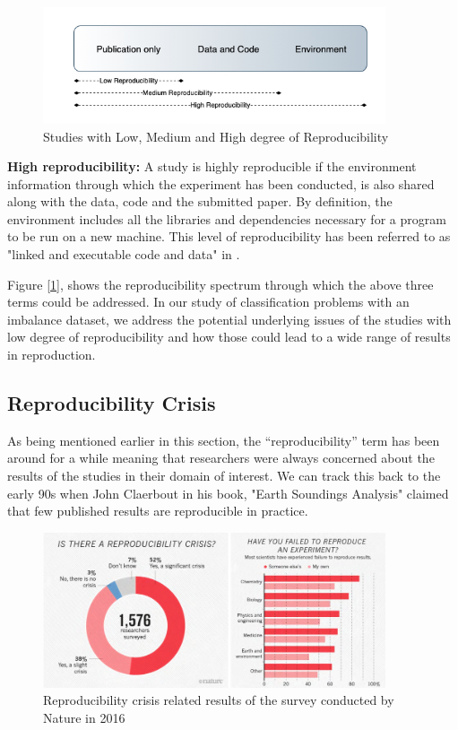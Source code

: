 \begin{figure}[ht]
    \centering
    \includegraphics[width=0.90\textwidth]{figures/02HighLowReproducibility.jpg}
    \caption{Studies with Low, Medium and High degree of Reproducibility}
    \label{fig:LowHighReproducibility}
\end{figure}

\textbf{High reproducibility:} A study is highly reproducible if the environment information through which the experiment 
has been conducted, is also shared along with the data, code and the submitted paper. By definition, the environment 
includes all the libraries and dependencies necessary for a program to be run on a new machine. This level of reproducibility 
has been referred to as "linked and executable code and data" in \cite{peng_reproducible_2011}.

Figure [\ref{fig:LowHighReproducibility}], shows the reproducibility spectrum through which the above three terms 
could be addressed. In our study of classification problems with an imbalance dataset, we address the potential 
underlying issues of the studies with low degree of reproducibility and how those could lead to a wide range of 
results in reproduction.

\subsection{Reproducibility Crisis}
As being mentioned earlier in this section, the “reproducibility” term has been around for a while meaning that 
researchers were always concerned about the results of the studies in their domain of interest. We can track this 
back to the early 90s when John Claerbout in his book, "Earth Soundings Analysis" \cite{claerbout_earth_1992} 
claimed that few published results are reproducible in practice. 

\begin{figure}[ht]
    \centering
    \includegraphics[width=0.90\textwidth]{figures/04NatureMagazine.png}
    \caption{Reproducibility crisis related results of the survey conducted by Nature in 2016 \cite{baker_1500_2016}}
    \label{fig:reproducibilityCrisis}
\end{figure}

